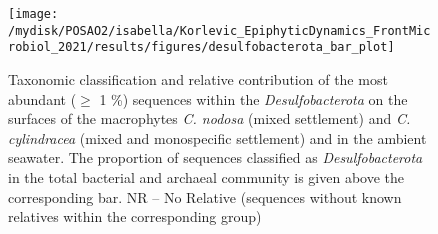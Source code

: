 \documentclass[
  12pt,
]{article}
\begin{document}
\begin{figure}[H]

{\centering \texttt{[image: /mydisk/POSAO2/isabella/Korlevic\_EpiphyticDynamics\_FrontMicrobiol\_2021/results/figures/desulfobacterota\_bar\_plot]} 

}

\caption{Taxonomic classification and relative contribution of the most abundant ($\geq$ 1 \si{\percent}) sequences within the \textit{Desulfobacterota} on the surfaces of the macrophytes \textit{C. nodosa} (mixed settlement) and \textit{C. cylindracea} (mixed and monospecific settlement) and in the ambient seawater. The proportion of sequences classified as \textit{Desulfobacterota} in the total bacterial and archaeal community is given above the corresponding bar. NR -- No Relative (sequences without known relatives within the corresponding group)\label{desulfo}}\label{fig:unnamed-chunk-9}
\end{figure}
\end{document}
